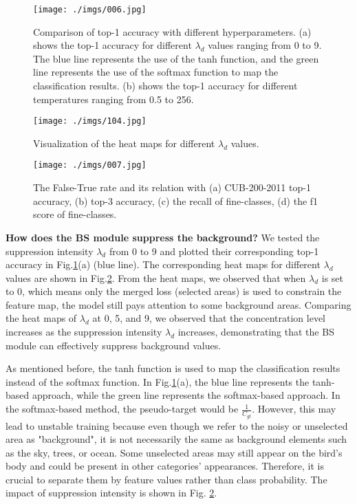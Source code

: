 \documentclass[journal]{IEEEtran}
\begin{document}
\begin{figure}[t]
    \begin{center}
    \texttt{[image: ./imgs/006.jpg]}
    \end{center}
\caption{Comparison of top-1 accuracy with different hyperparameters. (a) shows the top-1 accuracy for different $\lambda_{d}$ values ranging from 0 to 9. The blue line represents the use of the tanh function, and the green line represents the use of the softmax function to map the classification results. (b) shows the top-1 accuracy for different temperatures ranging from 0.5 to 256.}
\label{fig:Temperature_and_BS_lambda}
\end{figure}

\begin{figure}
    \begin{center}
    \texttt{[image: ./imgs/104.jpg]}
    \end{center}
\caption{Visualization of the heat maps for different $\lambda_{d}$ values.}
\label{fig:BS_Heat}
\end{figure}

\begin{figure}[t]
    \begin{center}
    \texttt{[image: ./imgs/007.jpg]}
    \end{center}
\caption{The False-True rate and its relation with (a) CUB-200-2011 top-1 accuracy, (b) top-3 accuracy, (c) the recall of fine-classes, (d) the f1 score of fine-classes.}
\label{fig:False-True}
\end{figure}

\textbf{How does the BS module suppress the background?} We tested the suppression intensity $\lambda_{d}$ from 0 to 9 and plotted their corresponding top-1 accuracy in Fig.\ref{fig:Temperature_and_BS_lambda}(a) (blue line). The corresponding heat maps for different $\lambda_{d}$ values are shown in Fig.\ref{fig:BS_Heat}. From the heat maps, we observed that when $\lambda_{d}$ is set to 0, which means only the merged loss (selected areas) is used to constrain the feature map, the model still pays attention to some background areas. Comparing the heat maps of $\lambda_{d}$ at 0, 5, and 9, we observed that the concentration level increases as the suppression intensity $\lambda_{d}$ increases, demonstrating that the BS module can effectively suppress background values. 

As mentioned before, the tanh function is used to map the classification results instead of the softmax function. In Fig.\ref{fig:Temperature_and_BS_lambda}(a), the blue line represents the tanh-based approach, while the green line represents the softmax-based approach. In the softmax-based method, the pseudo-target would be $\frac{1}{C_{gt}}$. However, this may lead to unstable training because even though we refer to the noisy or unselected area as "background", it is not necessarily the same as background elements such as the sky, trees, or ocean. Some unselected areas may still appear on the bird's body and could be present in other categories' appearances. Therefore, it is crucial to separate them by feature values rather than class probability. The impact of suppression intensity is shown in Fig. \ref{fig:BS_Heat}.
\end{document}
